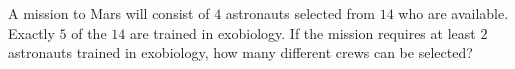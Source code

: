 A mission to Mars will consist of $4$ astronauts selected from $14$ who are available. Exactly $5$ of the $14$ are trained in exobiology. If the mission requires at least $2$ astronauts trained in exobiology, how many different crews can be selected?
